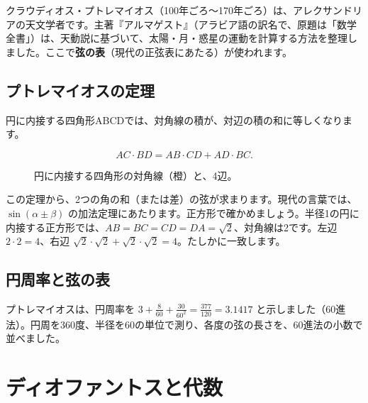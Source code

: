 \documentclass[a4paper,11pt,openany]{ltjsbook}
\begin{document}
クラウディオス・プトレマイオス（100年ごろ〜170年ごろ）は、アレクサンドリアの天文学者です。主著『アルマゲスト』（アラビア語の訳名で、原題は「数学全書」）は、天動説に基づいて、太陽・月・惑星の運動を計算する方法を整理しました。ここで\textbf{弦の表}（現代の正弦表にあたる）が使われます。

\subsection{プトレマイオスの定理}

円に内接する四角形ABCDでは、対角線の積が、対辺の積の和に等しくなります。

\[
AC\cdot BD=AB\cdot CD+AD\cdot BC.
\]

\begin{figure}[htbp]
\centering
{}
\caption{円に内接する四角形の対角線（橙）と、4辺。}
\end{figure}

この定理から、2つの角の和（または差）の弦が求まります。現代の言葉では、$\sin(\alpha\pm\beta)$ の加法定理にあたります。正方形で確かめましょう。半径1の円に内接する正方形では、$AB=BC=CD=DA=\sqrt2$、対角線は2です。左辺 $2\cdot2=4$、右辺 $\sqrt2\cdot\sqrt2+\sqrt2\cdot\sqrt2=4$。たしかに一致します。

\subsection{円周率と弦の表}

プトレマイオスは、円周率を $3+\tfrac{8}{60}+\tfrac{30}{60^2}=\tfrac{377}{120}=3.1417$ と示しました（60進法）。円周を360度、半径を60の単位で測り、各度の弦の長さを、60進法の小数で並べました。

\section{ディオファントスと代数}
\end{document}
